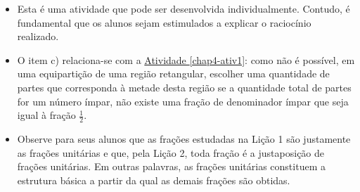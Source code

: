 \begin{orientacoes}{}{}

\begin{itemize} %
    \item       Esta é uma atividade que pode ser desenvolvida individualmente.
Contudo, é fundamental que os alunos sejam estimulados a explicar o raciocínio
realizado.
    \item       O item c) relaciona-se com a \hyperref[chap4-ativ1]{Atividade \ref{chap4-ativ1}}: como não é possível,
em uma equipartição de uma região retangular, escolher uma quantidade de partes
que corresponda à metade desta região se a quantidade total de partes for um
número ímpar, não existe uma fração de denominador ímpar que seja igual à fração
      $\frac{1}{2}$.
    \item       Observe para seus alunos que as frações estudadas na Lição 1 são
justamente as frações unitárias e que, pela Lição 2, toda fração é a
justaposição de frações unitárias. Em outras palavras, as frações unitárias
constituem a estrutura básica a partir da qual as demais frações são obtidas.
\end{itemize} %




\end{orientacoes}

